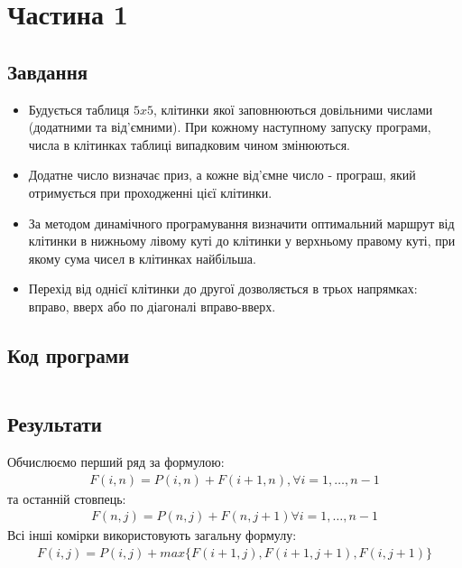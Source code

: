 \section{Частина 1}
\label{sec:task1}

\subsection{Завдання}
\label{subsec:task1_task}

\begin{itemize}
      \item Будується таблиця $5x5$, клітинки якої
            заповнюються довільними числами (додатними та від'ємними).
            При кожному наступному запуску програми, числа в клітинках таблиці
            випадковим чином змінюються.
      \item Додатне число визначає приз, а кожне від'ємне число - програш,
            який отримується при проходженні цієї клітинки.
      \item За методом динамічного програмування визначити оптимальний маршрут
            від клітинки в нижньому лівому куті до клітинки у верхньому правому куті,
            при якому сума чисел в клітинках найбільша.
      \item Перехід від однієї клітинки до другої дозволяється в трьох напрямках:
            вправо, вверх або по діагоналі вправо-вверх.
\end{itemize}

\subsection{Код програми}
\label{subsec:task1_code}
\inputminted{python}{../src/task1.py}

\subsection{Результати}
\label{subsec:task1_results}

Обчислюємо перший ряд за формулою:
\begin{align}
      F(i, n) = P(i, n) + F(i + 1, n), \forall i = 1, \dots, n - 1
\end{align}
та останній стовпець:
\begin{align}
      F(n, j) = P(n, j) + F(n, j + 1) \forall i = 1, \dots, n - 1
\end{align}
Всі інші комірки використовують загальну формулу:
\begin{align}
      F(i, j) = P(i, j) + max\{
      F(i + 1, j),
      F(i + 1, j + 1),
      F(i, j + 1)
      \}
\end{align}

